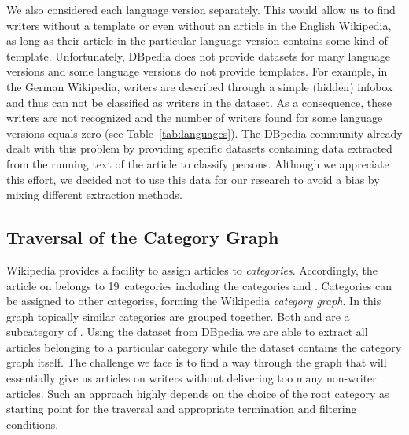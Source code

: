 \documentclass[a4paper,12pt]{scrartcl}
\begin{document}

We also considered each language version separately. This would
allow us to find writers without a  template or even
without an article in the English Wikipedia, as long as their article
in the particular language version contains some kind of
 template.
%
Unfortunately, DBpedia does not provide 
datasets for many language versions and some language versions do
not provide  templates. For example, in the German
Wikipedia, writers are described through a simple (hidden)
 infobox and thus can not be classified as writers in the
 dataset. As a consequence, these writers
are not recognized and the number of writers found for some language
versions equals zero (see Table~\ref{tab:languages}). The DBpedia
community already dealt with this problem by providing specific
datasets containing data extracted from the running text of the
article to classify persons. Although we appreciate this effort, we
decided not to use this data for our research to avoid a bias by
mixing different extraction methods.


\subsection{Traversal of the Category Graph}\label{sec:category_graph}

Wikipedia provides a facility to assign articles to
\emph{categories}. Accordingly, the article on  belongs to 19~categories including the categories
and . %
%
Categories can be assigned to other categories, forming the Wikipedia
\emph{category graph}. In this graph topically similar categories are
grouped together. Both 
and  are a
subcategory of . 
Using the  dataset from DBpedia we are
able to extract all articles belonging to a particular category while
the  dataset contains the category graph
itself. The challenge we face is to find a way through the graph that
will essentially give us articles on writers without delivering too
many non-writer articles.
%
Such an approach highly depends on the choice of the root category as
starting point for the traversal and appropriate termination and filtering
conditions.
\end{document}
